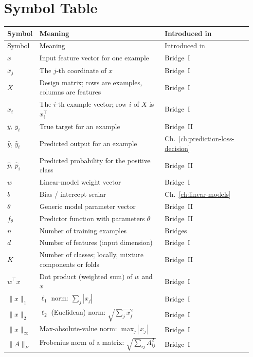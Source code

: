 \section{Symbol Table}

\begingroup
\small
\setlength{\tabcolsep}{4pt}
\begin{longtable}{@{}L{2.0cm}L{5.55cm}L{2.6cm}@{}}
\toprule
Symbol & Meaning & Introduced in \\
\midrule
\endfirsthead
\toprule
Symbol & Meaning & Introduced in \\
\midrule
\endhead
\bottomrule
\endfoot
$x$ & Input feature vector for one example & Bridge~I \\
$x_j$ & The $j$-th coordinate of $x$ & Bridge~I \\
$X$ & Design matrix; rows are examples, columns are features & Bridge~I \\
$x_i$ & The $i$-th example vector; row \(i\) of \(X\) is \(x_i^\top\) & Bridge~I \\
$y$, $y_i$ & True target for an example & Bridge~II \\
$\hat{y}$, $\hat{y}_i$ & Predicted output for an example & Ch.~\ref{ch:prediction-loss-decision} \\
$\hat{p}$, $\hat{p}_i$ & Predicted probability for the positive class & Bridge~II \\
$w$ & Linear-model weight vector & Bridge~I \\
$b$ & Bias / intercept scalar & Ch.~\ref{ch:linear-models} \\
$\theta$ & Generic model parameter vector & Bridge~II \\
$f_\theta$ & Predictor function with parameters $\theta$ & Bridge~II \\
$n$ & Number of training examples & Bridges \\
$d$ & Number of features (input dimension) & Bridge~I \\
$K$ & Number of classes; locally, mixture components or folds & Bridge~II \\
$w^\top x$ & Dot product (weighted sum) of $w$ and $x$ & Bridge~I \\
$\|x\|_1$ & $\ell_1$ norm: $\sum_j |x_j|$ & Bridge~I \\
$\|x\|_2$ & $\ell_2$ (Euclidean) norm: $\sqrt{\sum_j x_j^2}$ & Bridge~I \\
$\|x\|_\infty$ & Max-absolute-value norm: $\max_j |x_j|$ & Bridge~I \\
$\|A\|_F$ & Frobenius norm of a matrix: $\sqrt{\sum_{ij} A_{ij}^2}$ & Bridge~I \\

\end{longtable}
